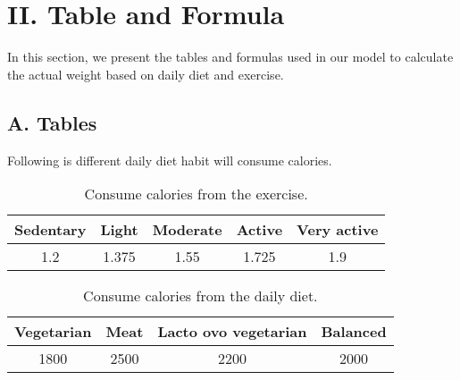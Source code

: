 \documentclass[a4paper,12pt]{article}
\begin{document}
\section*{II. Table and Formula}
\noindent
In this section, we present the tables and formulas used in our model to calculate the actual weight based on daily diet and exercise. \\
\subsection*{A. Tables}
Following is different daily diet habit will consume calories.
\renewcommand{\arraystretch}{1.5}
\begin{table}[h]
\centering
\begin{tabular}{|c|c|c|c|c|}
\hline
\textbf{Sedentary} & \textbf{Light} & \textbf{Moderate} & \textbf{Active} & \textbf{Very active} \\
\hline
1.2 & 1.375 & 1.55 & 1.725 & 1.9 \\
\hline
\end{tabular}
\caption{Consume calories from the exercise.}
\end{table}
\begin{table}[h]
\centering
\begin{tabular}{|c|c|c|c|}
\hline
\textbf{Vegetarian} & \textbf{Meat} & \textbf{Lacto ovo vegetarian} & \textbf{Balanced} \\
\hline
1800 & 2500 & 2200 & 2000 \\
\hline
\end{tabular}
\caption{Consume calories from the daily diet.}
\end{table}
\end{document}
